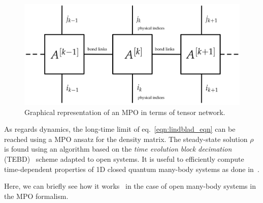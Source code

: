 \begin{figure}[H]
    \centering
    \includegraphics[scale=0.4]{Figures/mpo_graphical.png}
    \captionsetup{width=1.\linewidth}
    \caption{Graphical representation of an MPO in terms of tensor network.}
    \label{fig:mpo_graphical}
\end{figure}

As regards dynamics, the long-time limit of eq.~\ref{eqn:lindblad_eqn} can be reached using a MPO ansatz for the density matrix. The steady-state solution $\rho$ is found using an algorithm based on the \emph{time evolution block decimation} (TEBD)~\cite{PhysRevLett.91.147902} scheme adapted to open systems. It is useful to efficiently compute time-dependent properties of 1D closed quantum many-body systems as done in~\cite{PhysRevLett.93.040502}. 

Here, we can briefly see how it works~\cite{jin_biella_ross} in the case of open many-body systems in the MPO formalism. 


